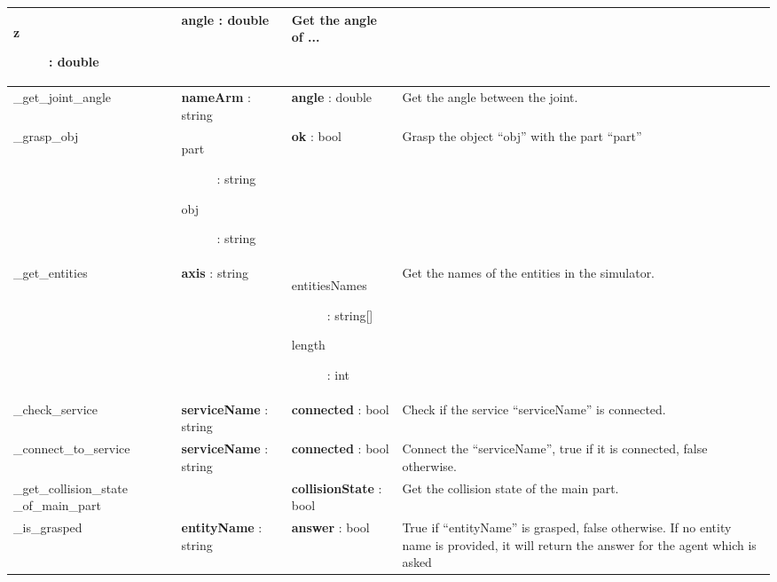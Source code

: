 \begin{supertabular}{|p{2.9cm}|p{2.5cm}|p{3cm}|p{5.5cm}|}
\begin{minipage}{3cm}
\begin{description}
  				\item[z] : double
  			\end{description}
  			\medskip
  		\end{minipage} & \textbf{angle} : double & Get the angle of ...\\
  	\hline
  	\_get\_joint\_angle & \textbf{nameArm} : string & \textbf{angle} : double & Get the angle between the joint.\\
  	\hline
  	\_grasp\_obj & 
  		\begin{minipage}{3cm}
  			\medskip
  			\begin{description} 
  				\item[part] : string
  				\item[obj] : string
  			\end{description}
  			\medskip
  		\end{minipage} & \textbf{ok} : bool & Grasp the object ``obj'' with the part ``part''\\
  	\hline
  	\_get\_entities & \textbf{axis} : string & 
  		\begin{minipage}{3cm}
  			\medskip
  			\begin{description} 
  				\item[entitiesNames] : string[] 
  				\item[length] : int
  			\end{description}
  			\medskip
  		\end{minipage} & Get the names of the entities in the simulator.\\
  	\hline
  	\_check\_service & \textbf{serviceName} : string & \textbf{connected} : bool & Check if the service ``serviceName'' is connected.\\
  	\hline
  	\_connect\_to\_service & \textbf{serviceName} : string & \textbf{connected} : bool & Connect the ``serviceName'', true if it is connected, false otherwise.\\
  	\hline
  	\_get\_collision\_state \_of\_main\_part & & \textbf{collisionState} : bool & Get the collision state of the main part.\\
  	\hline
  	\_is\_grasped & \textbf{entityName} : string & \textbf{answer} : bool & True if ``entityName'' is grasped, false otherwise. If no entity name is provided, it will return the answer for the agent which is asked\\
  	\hline
\end{supertabular}

